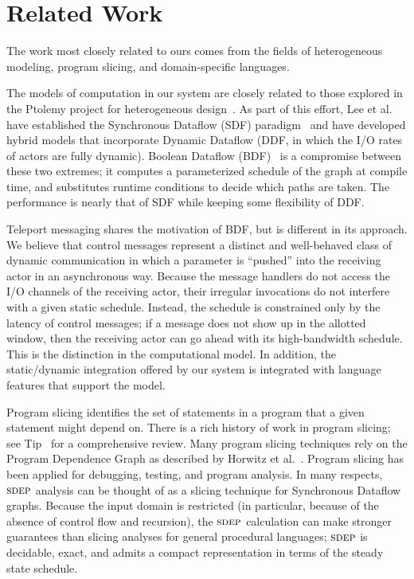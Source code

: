 \documentclass{sig-alternate}
\begin{document}
\section{Related Work}
\label{sec:related-work}

The work most closely related to ours comes from the fields of
heterogeneous modeling, program slicing, and domain-specific
languages.

The models of computation in our system are closely related to those
explored in the Ptolemy project for heterogeneous
design~\cite{ptolemy03overview}.  As part of this effort, Lee et
al. have established the Synchronous Dataflow (SDF)
paradigm~\cite{LM87-i} and have developed hybrid models that
incorporate Dynamic Dataflow (DDF, in which the I/O rates of actors
are fully dynamic).  Boolean Dataflow (BDF)~\cite{ha97profile} is a
compromise between these two extremes; it computes a parameterized
schedule of the graph at compile time, and substitutes runtime
conditions to decide which paths are taken.  The performance is nearly
that of SDF while keeping some flexibility of DDF.  

Teleport messaging shares the motivation of BDF, but is different in
its approach.  We believe that control messages represent a distinct
and well-behaved class of dynamic communication in which a parameter
is ``pushed'' into the receiving actor in an asynchronous way.
Because the message handlers do not access the I/O channels of the
receiving actor, their irregular invocations do not interfere with a
given static schedule.  Instead, the schedule is constrained only by
the latency of control messages; if a message does not show up in the
allotted window, then the receiving actor can go ahead with its
high-bandwidth schedule.  This is the distinction in the computational
model.  In addition, the static/dynamic integration offered by our
system is integrated with language features that support the model.

Program slicing identifies the set of statements in a program that a
given statement might depend on.  There is a rich history of work in
program slicing; see Tip~\cite{tip95slice} for a comprehensive review.
Many program slicing techniques rely on the Program Dependence Graph
as described by Horwitz et al.~\cite{hrb88pdg}.  Program slicing has
been applied for debugging, testing, and program analysis.  In many
respects, $\textsc{sdep}$ analysis can be thought of as a slicing technique
for Synchronous Dataflow graphs.  Because the input domain is
restricted (in particular, because of the absence of control flow and
recursion), the $\textsc{sdep}$ calculation can make stronger guarantees than
slicing analyses for general procedural languages; $\textsc{sdep}$ is
decidable, exact, and admits a compact representation in terms of the
steady state schedule.
\end{document}
